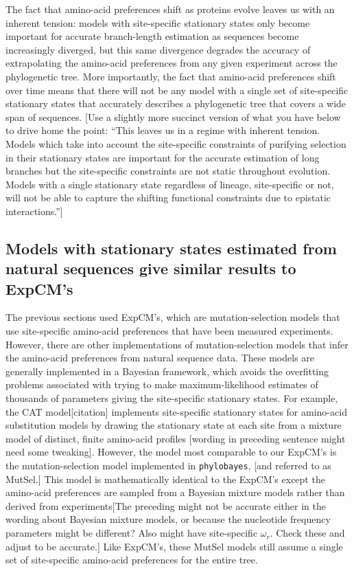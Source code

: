 \documentclass[11pt]{article}
\newcommand\jdbcomment[1]{{\color{red}[#1]}}
\begin{document}
The fact that amino-acid preferences shift as proteins evolve leaves us with an inherent tension: models with site-specific stationary states only become important for accurate branch-length estimation as sequences become increasingly diverged, but this same divergence degrades the accuracy of extrapolating the amino-acid preferences from any given experiment across the phylogenetic tree.
More importantly, the fact that amino-acid preferences shift over time means that there will not be any model with a single set of site-specific stationary states that accurately describes a phylogenetic tree that covers a wide span of sequences.
\jdbcomment{Use a slightly more succinct version of what you have below to drive home the point:
``This leaves us in a regime with inherent tension. 
Models which take into account the site-specific constraints of purifying selection in their stationary states are important for the accurate estimation of long branches but the site-specific constraints are not static throughout evolution. 
Models with a single stationary state regardless of lineage, site-specific or not, will not be able to capture the shifting functional constraints due to epistatic interactions.''} 

\subsection*{Models with stationary states estimated from natural sequences give similar results to ExpCM's}
The previous sections used ExpCM's, which are mutation-selection models that use site-specific amino-acid preferences that have been measured experiments.
However, there are other implementations of mutation-selection models that infer the amino-acid preferences from natural sequence data.
These models are generally implemented in a Bayesian framework, which avoids the overfitting problems associated with trying to make maximum-likelihood estimates of thousands of parameters giving the site-specific stationary states.
For example, the CAT model\jdbcomment{citation} implements site-specific stationary states for amino-acid substitution models by drawing the stationary state at each site from a mixture model of distinct, finite amino-acid profiles \jdbcomment{wording in preceding sentence might need some tweaking}.
However, the model most comparable to our ExpCM's is the mutation-selection model implemented in \texttt{phylobayes}, \jdbcomment{and referred to as MutSel.}
This  model is mathematically identical to the ExpCM's except the amino-acid preferences are sampled from a Bayesian mixture models rather than derived from experiments\jdbcomment{The preceding might not be accurate either in the wording about Bayesian mixture models, or because the nucleotide frequency parameters might be different? Also might have site-specific $\omega_r$. Check these and adjust to be accurate.}
Like ExpCM's, these MutSel models still assume a single set of site-specific amino-acid preferences for the entire tree.
\end{document}
